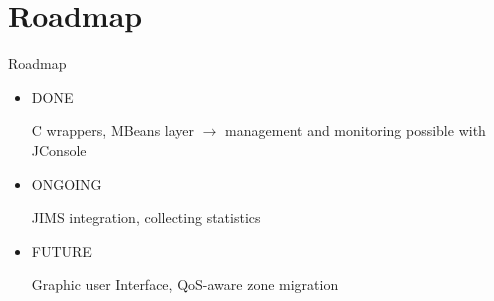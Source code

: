 \documentclass{beamer}
\begin{document}
\section{Roadmap}

	\begin{frame}{Roadmap}
		
		\begin{itemize}

			\item DONE
			
				C wrappers, MBeans layer $\rightarrow$ management and monitoring possible with JConsole

			\item ONGOING
			
				JIMS integration, collecting statistics

			\item FUTURE
			
				Graphic user Interface, QoS-aware zone migration

		\end{itemize}

	\end{frame}
\end{document}
